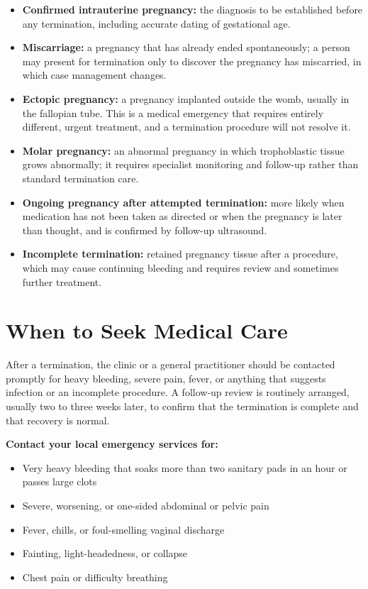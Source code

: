\begin{itemize}
    \item \textbf{Confirmed intrauterine pregnancy:} the diagnosis to be established before any termination, including accurate dating of gestational age.
    \item \textbf{Miscarriage:} a pregnancy that has already ended spontaneously; a person may present for termination only to discover the pregnancy has miscarried, in which case management changes.
    \item \textbf{Ectopic pregnancy:} a pregnancy implanted outside the womb, usually in the fallopian tube. This is a medical emergency that requires entirely different, urgent treatment, and a termination procedure will not resolve it.
    \item \textbf{Molar pregnancy:} an abnormal pregnancy in which trophoblastic tissue grows abnormally; it requires specialist monitoring and follow-up rather than standard termination care.
    \item \textbf{Ongoing pregnancy after attempted termination:} more likely when medication has not been taken as directed or when the pregnancy is later than thought, and is confirmed by follow-up ultrasound.
    \item \textbf{Incomplete termination:} retained pregnancy tissue after a procedure, which may cause continuing bleeding and requires review and sometimes further treatment.
\end{itemize}

\section*{When to Seek Medical Care}
After a termination, the clinic or a general practitioner should be contacted promptly for heavy bleeding, severe pain, fever, or anything that suggests infection or an incomplete procedure. A follow-up review is routinely arranged, usually two to three weeks later, to confirm that the termination is complete and that recovery is normal.

\textbf{Contact your local emergency services for:}
\begin{itemize}
    \item Very heavy bleeding that soaks more than two sanitary pads in an hour or passes large clots
    \item Severe, worsening, or one-sided abdominal or pelvic pain
    \item Fever, chills, or foul-smelling vaginal discharge
    \item Fainting, light-headedness, or collapse
    \item Chest pain or difficulty breathing
\end{itemize}

